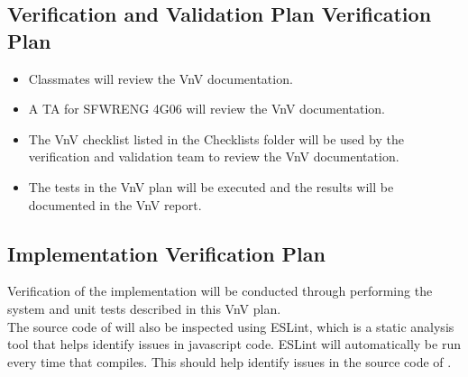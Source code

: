\documentclass[12pt, titlepage]{article}
\begin{document}



\subsection{Verification and Validation Plan Verification Plan}

\begin{itemize}
    \item Classmates will review the VnV documentation.
    \item A TA for SFWRENG 4G06 will review the VnV documentation.
    \item The VnV checklist listed in the Checklists folder will be used by the verification and validation team to review the VnV documentation.
    \item The tests in the VnV plan will be executed and the results will be documented in the VnV report.
\end{itemize}






\subsection{Implementation Verification Plan}

Verification of the implementation will be conducted through performing the system and unit tests described in this VnV plan. \\

The source code of \progname{} will also be inspected using ESLint, which is a static analysis tool that helps identify issues in javascript code. ESLint will automatically be run every time that \progname{} compiles. This should help identify issues in the source code of \progname{}.

\end{document}
